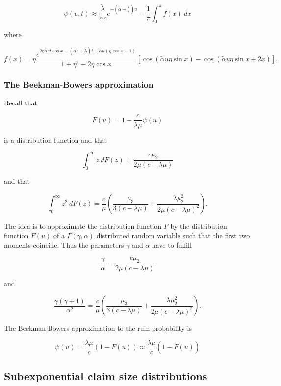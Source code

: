 \documentclass[a4paper,10pt,openany]{book}
\begin{document}
\[
\psi(u,t)\approx \frac{\tilde \lambda}{\tilde\alpha\tilde c}e^{-\left(\tilde\alpha-\frac{\tilde \lambda}{\tilde c}\right)u}-\frac{1}{\pi}\int_0^\pi f(x)\ dx
\]

where

\[
f(x)=\eta\frac{e^{2\eta\tilde\alpha\tilde c t \cos x-(\tilde\alpha\tilde c + \tilde \lambda)t+\tilde\alpha u(\eta \cos x - 1)}}{1+\eta^2-2\eta \cos x}[\cos(\tilde\alpha u\eta\sin x)-\cos(\tilde \alpha u \eta \sin x + 2x)].
\]

\hypertarget{the-beekman-bowers-approximation}{%
\subsubsection{The Beekman-Bowers approximation}\label{the-beekman-bowers-approximation}}

Recall that

\[
F(u)=1-\frac{c}{\lambda \mu}\psi(u)
\]

is a distribution function and that

\[
\int_0^\infty z\ dF(z)=\frac{c\mu_2}{2\mu(c-\lambda\mu)}
\]

and that

\[
\int_0^\infty z^2\ dF(z)=\frac{c}{\mu}\left(\frac{\mu_3}{3(c-\lambda\mu)}+\frac{\lambda\mu_2^2}{2\mu(c-\lambda\mu)^2}\right).
\]

The idea is to approximate the distribution function \(F\) by the distribution function \(\tilde F(u)\) of a \(\Gamma(\gamma,\alpha)\) distributed random variable such that the first two moments coincide. Thus the parameters \(\gamma\) and \(\alpha\) have to fulfill

\[
\frac{\gamma}{\alpha}=\frac{c\mu_2}{2\mu(c-\lambda \mu)}
\]

and

\[
\frac{\gamma(\gamma +1)}{\alpha^2}=\frac{c}{\mu}\left(\frac{\mu_3}{3(c-\lambda\mu)}+\frac{\lambda\mu_2^2}{2\mu(c-\lambda\mu)^2}\right).
\]

The Beekman-Bowers approximation to the ruin probability is

\[
\psi(u)=\frac{\lambda \mu}{c}(1-F(u))\approx \frac{\lambda\mu}{c}(1-\tilde F(u))
\]

\hypertarget{subexponential-claim-size-distributions}{%
\subsection{Subexponential claim size distributions}\label{subexponential-claim-size-distributions}}
\end{document}
